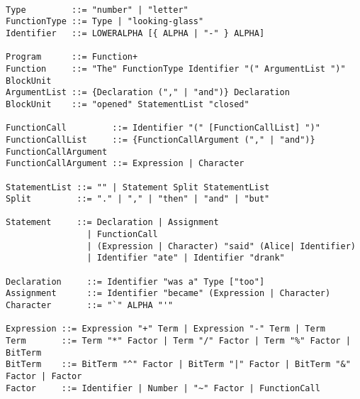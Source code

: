 \documentclass[a4wide, 11pt]{article}
\begin{document}
\begin{verbatim}

Type         ::= "number" | "letter"
FunctionType ::= Type | "looking-glass"
Identifier   ::= LOWERALPHA [{ ALPHA | "-" } ALPHA]

Program      ::= Function+
Function     ::= "The" FunctionType Identifier "(" ArgumentList ")" BlockUnit
ArgumentList ::= {Declaration ("," | "and")} Declaration
BlockUnit    ::= "opened" StatementList "closed"

FunctionCall         ::= Identifier "(" [FunctionCallList] ")"
FunctionCallList     ::= {FunctionCallArgument ("," | "and")} FunctionCallArgument
FunctionCallArgument ::= Expression | Character

StatementList ::= "" | Statement Split StatementList
Split         ::= "." | "," | "then" | "and" | "but"

Statement     ::= Declaration | Assignment
                | FunctionCall
                | (Expression | Character) "said" (Alice| Identifier)
                | Identifier "ate" | Identifier "drank"
               
Declaration     ::= Identifier "was a" Type ["too"]
Assignment      ::= Identifier "became" (Expression | Character)
Character       ::= "`" ALPHA "'"

Expression ::= Expression "+" Term | Expression "-" Term | Term
Term       ::= Term "*" Factor | Term "/" Factor | Term "%" Factor | BitTerm
BitTerm    ::= BitTerm "^" Factor | BitTerm "|" Factor | BitTerm "&" Factor | Factor
Factor     ::= Identifier | Number | "~" Factor | FunctionCall

\end{verbatim}
\end{document}
